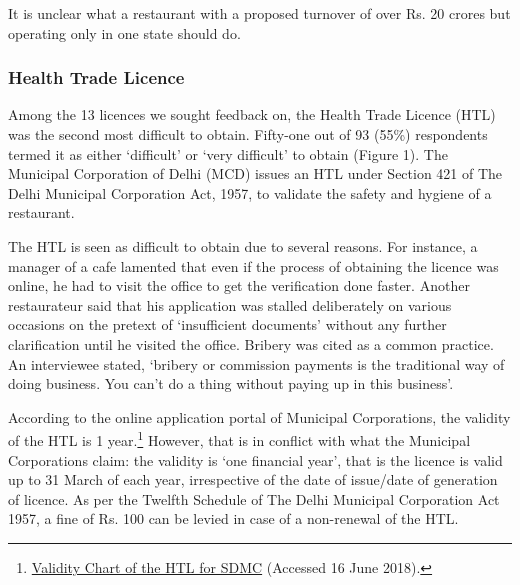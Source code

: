 \documentclass[a4paper, 12pt]{article}
\begin{document}
                    It is unclear what a restaurant with a proposed turnover of over Rs. 20 crores but operating only in one state should do. %
                    
                    
                          
                                         
                    \subsubsection{Health Trade Licence}
                    Among the 13 licences we sought feedback on, the Health Trade Licence (HTL) was the second most difficult to obtain. Fifty-one out of 93 (55\%) respondents termed it as either ‘difficult’ or ‘very difficult’ to obtain (Figure 1). The Municipal Corporation of Delhi (MCD) issues an HTL under Section 421 of The Delhi Municipal Corporation Act, 1957, to validate the safety and hygiene of a restaurant.
                    
                    The HTL is seen as difficult to obtain due to several reasons. For instance, a manager of a cafe lamented that even if the process of obtaining the licence was online, he had to visit the office to get the verification done faster. Another restaurateur said that his application was stalled deliberately on various occasions on the pretext of ‘insufficient documents’ without any further clarification until he visited the office. Bribery was cited as a common practice. An interviewee stated, ‘bribery or commission payments is the traditional way of doing business. You can’t do a thing without paying up in this business’.
                    
                    According to the online application portal of Municipal Corporations, the validity of the HTL is 1 year.\footnote{\href{https://bit.ly/2Qzd92r}{Validity Chart of the HTL for SDMC} (Accessed 16 June 2018).}  %
                    However, that is in conflict with what the Municipal Corporations claim: the validity is ‘one financial year’, that is the licence is valid up to 31 March of each year, irrespective of the date of issue/date of generation of licence. As per the Twelfth Schedule of The Delhi Municipal Corporation Act 1957, a fine of Rs. 100 can be levied in case of a non-renewal of the HTL. %
  
\end{document}
